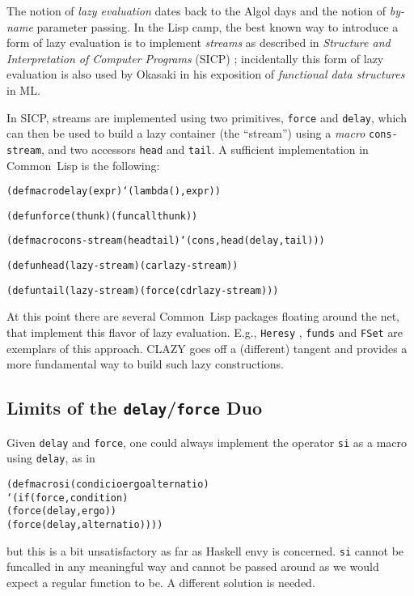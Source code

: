 \documentclass[fleqn,10pt]{article}
\newcommand{\CL}{\textsf{Common~Lisp}}
\newcommand{\CLAZY}{\textsf{CLAZY}}
\newcommand{\code}[1]{\texttt{#1}}
\begin{document}
The notion of \emph{lazy evaluation} dates back to the Algol days and
the notion of \emph{by-name} parameter passing.  In the Lisp camp, the
best known way to introduce a form of lazy evaluation is to implement
\emph{streams} as described in \emph{Structure and Interpretation of
  Computer Programs} (SICP) \cite{SICP}; incidentally this form of
lazy evaluation is also used by Okasaki \cite{okasaki98:_pfds} in his
exposition of \emph{functional data structures} in ML.

In SICP, streams are implemented using two primitives, \code{force}
and \code{delay}, which can then be used to build a lazy container
(the ``stream'') using a \emph{macro} \code{cons-stream}, and two
accessors \code{head} and \code{tail}.  A sufficient implementation in
\CL{} is the following:
\begin{alltt}
    (defmacro delay (expr) `(lambda () ,expr))

    (defun force (thunk) (funcall thunk))

    (defmacro cons-stream (head tail) `(cons ,head (delay ,tail)))

    (defun head (lazy-stream) (car lazy-stream))

    (defun tail (lazy-stream) (force (cdr lazy-stream)))
\end{alltt}
At this point there are several \CL{} packages floating around the
net, that implement this flavor of lazy evaluation. E.g., \code{Heresy}
\cite{lamari07:_heresy}, \code{funds} \cite{baine07:_funds} and \code{FSet}
\cite{burson07:_fset} are exemplars of this approach. \CLAZY{} goes
off a (different) tangent and provides a more fundamental way to build
such lazy constructions.

\subsection{Limits of the \code{delay}/\code{force} Duo}

Given \code{delay} and \code{force}, one could always implement the
operator \code{si} as a macro using \code{delay}, as in
\begin{alltt}

    (defmacro si (condicio ergo alternatio)
       `(if (force ,condition)
            (force (delay ,ergo))
            (force (delay ,alternatio))))

\end{alltt}
but this is a bit unsatisfactory as far as Haskell envy is
concerned. \code{si} cannot be funcalled in any meaningful way and
cannot be passed around as we would expect a regular function to
be.  A different solution is needed.
\end{document}
